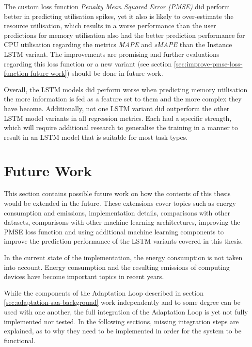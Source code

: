         The custom loss function \emph{Penalty Mean Squared Error (PMSE)} did perform better in predicting utilisation spikes, yet it also is likely to over-estimate the resource utilisation, which results in a worse performance than the user predictions for memory utilisation also had the better prediction performance for CPU utilisation regarding the metrics \emph{MAPE} and \emph{sMAPE} than the Instance LSTM variant.
        The improvements are promising and further evaluations regarding this loss function or a new variant (see section \ref{sec:improve-pmse-loss-function-future-work}) should be done in future work.

        Overall, the LSTM models did perform worse when predicting memory utilisation the more information is fed as a feature set to them and the more complex they have become.
        Additionally, not one LSTM variant did outperform the other LSTM model variants in all regression metrics.
        Each had a specific strength, which will require additional research to generalise the training in a manner to result in an LSTM model that is suitable for most task types. 



    \section{Future Work}
    \label{sec:future-work}

        This section contains possible future work on how the contents of this thesis would be extended in the future.
        These extensions cover topics such as energy consumption and \COTWO emissions, implementation details, comparisons with other datasets, comparisons with other machine learning architectures, improving the PMSE loss function and using additional machine learning components to improve the prediction performance of the LSTM variants covered in this thesis.
        
        In the current state of the implementation, the energy consumption is not taken into account.
        Energy consumption and the resulting \COTWO emissions of computing devices have become important topics in recent years.

        While the components of the Adaptation Loop described in section \ref{sec:adaptation-saa-background} work independently and to some degree can be used with one another, the full integration of the Adaptation Loop is yet not fully implemented nor tested.
        In the following sections, missing integration steps are explained, as to why they need to be implemented in order for the system to be functional.

